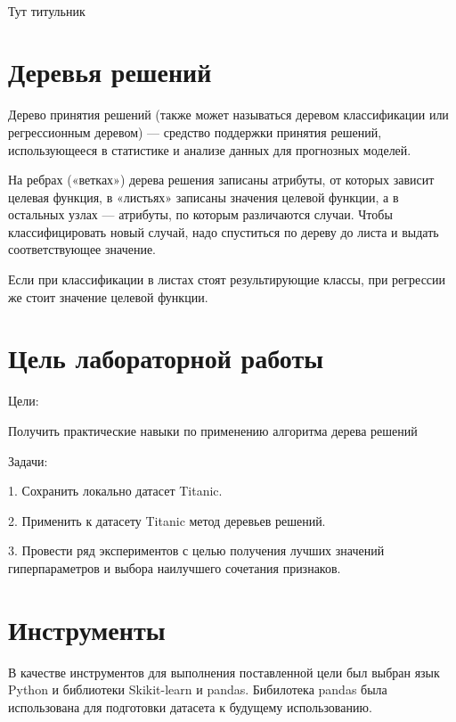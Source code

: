 \documentclass[a4paper,12pt]{article}
\begin{document}
\begin{titlepage}
\newpage

\

Тут титульник
\end{titlepage}

\newpage
\tableofcontents
\setcounter{page}{2}


\newpage\section{Деревья решений} 
	Дерево принятия решений (также может называться деревом классификации или регрессионным деревом) — средство поддержки принятия решений, использующееся в статистике и анализе данных для прогнозных моделей. 
	
	\vspace{0.5cm}
	На ребрах («ветках») дерева решения записаны атрибуты, от которых зависит целевая функция, в «листьях» записаны значения целевой функции, а в остальных узлах — атрибуты, по которым различаются случаи. Чтобы классифицировать новый случай, надо спуститься по дереву до листа и выдать соответствующее значение. 
	
	\vspace{0.5cm}
	Если при классификации в листах стоят результирующие классы, при регрессии же стоит значение целевой функции.
	
	
	
\newpage\section{Цель лабораторной работы} 
	Цели: 
	\vspace{0.5cm}
	
	Получить практические навыки по применению алгоритма дерева решений
	
	\vspace{0.5cm}
	Задачи: 
	
	\vspace{0.5cm}
	1. Сохранить локально датасет Titanic.
	
	\vspace{0.5cm}
	2. Применить к датасету Titanic метод деревьев решений.
	
	\vspace{0.5cm}
	3. Провести ряд экспериментов с целью получения лучших значений гиперпараметров и выбора наилучшего сочетания признаков.
	
\newpage\section{Инструменты} 
	В качестве инструментов для выполнения поставленной цели был выбран язык Python и библиотеки Skikit-learn и pandas.
	Бибилотека pandas была использована для подготовки датасета к будущему использованию.
	
\end{document}
